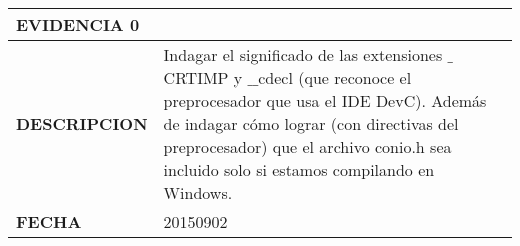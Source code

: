 \documentclass{article}
\def\Centrar#1{
\begin{center}
#1
\end{center}
}
\def\Evidencia#1#2#3{
\Centrar{
\begin{tabular}{|l|p{4in}|}
\hline
{\large\bf EVIDENCIA #1}&\\\hline
{\large\bf DESCRIPCION}&#2\\\hline
{\large\bf FECHA}&#3\\\hline
\end{tabular}
}}%
\begin{document}
\Evidencia{0}
{Indagar el signif\/icado de las extensiones 
$\_$CRTIMP y $\_\_$cdecl 
(que reconoce el preprocesador
que usa el IDE DevC). 
Adem\'{a}s de indagar c\'{o}mo lograr (con directivas del preprocesador) 
que el archivo conio.h sea incluido solo si estamos 
compilando en Windows.}{20150902}
\end{document}
